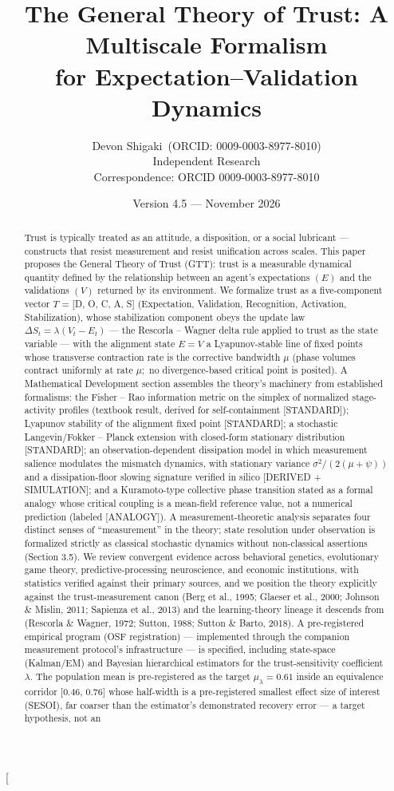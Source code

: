 \documentclass[11pt,twocolumn]{article}
\title{The General Theory of Trust: A Multiscale Formalism\\ for Expectation--Validation Dynamics}
\author{Devon Shigaki~(ORCID: 0009-0003-8977-8010)\\
\small Independent Research\\
\small Correspondence: ORCID 0009-0003-8977-8010}
\date{\small Version 4.5 --- November 2026}
\theoremstyle{gttdef}
\theoremstyle{gttplain}
\begin{document}
\twocolumn[{\begin{@twocolumnfalse}
\maketitle
\begin{abstract}
Trust is typically treated as an attitude, a disposition, or a social lubricant --- constructs that resist measurement and resist unification across scales. This paper proposes the General Theory of Trust (GTT): trust is a measurable dynamical quantity defined by the relationship between an agent's expectations $(E)$ and the validations $(V)$ returned by its environment. We formalize trust as a five-component vector $T$ = [D, O, C, A, S] (Expectation, Validation, Recognition, Activation, Stabilization), whose stabilization component obeys the update law $\Delta S_t = \lambda(V_t - E_t)$ --- the Rescorla -- Wagner delta rule applied to trust as the state variable --- with the alignment state $E = V$ a Lyapunov-stable line of fixed points whose transverse contraction rate is the corrective bandwidth $\mu$ (phase volumes contract uniformly at rate $\mu;$ no divergence-based critical point is posited). A Mathematical Development section assembles the theory's machinery from established formalisms: the Fisher -- Rao information metric on the simplex of normalized stage-activity profiles (textbook result, derived for self-containment [STANDARD]); Lyapunov stability of the alignment fixed point [STANDARD]; a stochastic Langevin/Fokker -- Planck extension with closed-form stationary distribution [STANDARD]; an observation-dependent dissipation model in which measurement salience modulates the mismatch dynamics, with stationary variance $\sigma^{2}/(2(\mu+\psi))$ and a dissipation-floor slowing signature verified in silico [DERIVED + SIMULATION]; and a Kuramoto-type collective phase transition stated as a formal analogy whose critical coupling is a mean-field reference value, not a numerical prediction (labeled [ANALOGY]). A measurement-theoretic analysis separates four distinct senses of ``measurement'' in the theory; state resolution under observation is formalized strictly as classical stochastic dynamics without non-classical assertions (Section 3.5). We review convergent evidence across behavioral genetics, evolutionary game theory, predictive-processing neuroscience, and economic institutions, with statistics verified against their primary sources, and we position the theory explicitly against the trust-measurement canon (Berg et al., 1995; Glaeser et al., 2000; Johnson \& Mislin, 2011; Sapienza et al., 2013) and the learning-theory lineage it descends from (Rescorla \& Wagner, 1972; Sutton, 1988; Sutton \& Barto, 2018). A pre-registered empirical program (OSF registration) --- implemented through the companion measurement protocol's infrastructure --- is specified, including state-space (Kalman/EM) and Bayesian hierarchical estimators for the trust-sensitivity coefficient $\lambda.$ The population mean is pre-registered as the target $\mu_\lambda = 0.61$ inside an equivalence corridor [0.46, 0.76] whose half-width is a pre-registered smallest effect size of interest (SESOI), far coarser than the estimator's demonstrated recovery error --- a target hypothesis, not an 
\end{abstract}
\end{@twocolumnfalse}}
\end{document}
